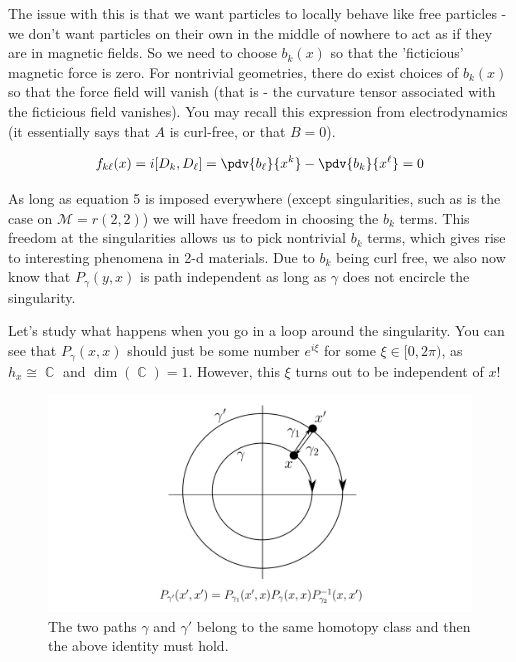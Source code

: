 \documentclass{article}
\DeclareMathOperator{\CC}{\mathbb{C}}
\begin{document}
The issue with this is that we want particles to locally behave like free particles - we don't want particles on their own in the middle of nowhere to act as if they are in magnetic fields. So we need to choose $b_k(x)$ so that the 'ficticious' magnetic force is zero. For nontrivial geometries, there do exist choices of $b_k(x)$ so that the force field will vanish (that is - the curvature tensor associated with the ficticious field vanishes). You may recall this expression from electrodynamics (it essentially says that $A$ is curl-free, or that $B=0$).

\begin{equation}
f_{k\ell}(x) = i[D_k,D_\ell] = \pdv{b_\ell}{x^k} - \pdv{b_k}{x^\ell}=0
\end{equation}

As long as equation 5 is imposed everywhere (except singularities, such as is the case on $\mathcal{M}=r(2,2)$) we will have freedom in choosing the $b_k$ terms. This freedom at the singularities allows us to pick nontrivial $b_k$ terms, which gives rise to interesting phenomena in 2-d materials. Due to $b_k$ being curl free, we also now know that $P_\gamma(y,x)$ is path independent as long as $\gamma$ does not encircle the singularity.

Let's study what happens when you go in a loop around the singularity. You can see that $P_\gamma(x,x)$ should just be some number $e^{i\xi}$ for some $\xi \in [0,2\pi)$, as $h_x \cong \CC$ and $\dim(\CC)=1$. However, this $\xi$ turns out to be independent of $x$!

\begin{figure}[ht]
    \centering
    \includegraphics[width=\linewidth]{Figures/path_independence_gauge.png}
    \captionsetup{belowskip=-15pt}
    \caption{The two paths $ \gamma $ and $ \gamma' $ belong to the same homotopy class and then the above identity must hold.}
    \label{fig:31}
\end{figure}
\end{document}
